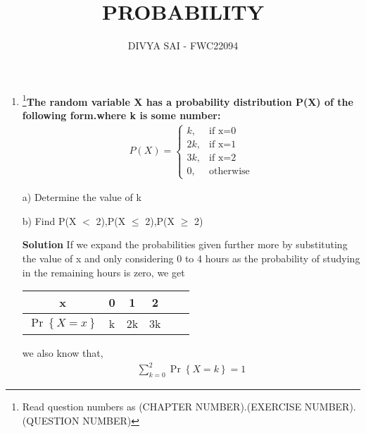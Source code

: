 \documentclass{article}
\providecommand{\cbrak}[1]{\ensuremath{\left\{#1\right\}}}
\begin{document}
\title{PROBABILITY}
\author{\Large DIVYA SAI - FWC22094}
\date{}

\maketitle
\begin{enumerate}
[label=16.\arabic{enumi}.\arabic{enumii}]%
\setcounter{enumi}{3}
\setcounter{enumii}{10}

\item \footnote{Read question numbers as (CHAPTER NUMBER).(EXERCISE NUMBER).(QUESTION NUMBER)}\textbf {The random variable X has a probability distribution P(X) of the following form.where k is some number: }
\begin{align}
  P(X) =
    \begin{cases}
      k,  & \text{if x=0}\\
      2k, & \text{if x=1}\\
      3k, & \text{if x=2}\\
      0 , & \text{otherwise}
    \end{cases}       
\end{align}

a) Determine the value of k 

b) Find P(X $<$ 2),P(X $\leq$ 2),P(X $\geq$ 2)  


\textbf{Solution}
If we expand the probabilities given further more
by substituting the value of x and only considering
0 to 4 hours as the probability of studying in the
remaining hours is zero, we get\\
\begin{center}
\begin{tabular}{|c|c|c|c|c|c|}
    \hline
    x &  0 & 1 & 2 \\
    \hline
    $\Pr\cbrak{X=x}$ & k & 2k & 3k\\
    \hline  
\end{tabular}
\end{center}

we also know that,
\begin{align}
    \sum_{k = 0}^2 \Pr\cbrak{X = k} = 1 \label{eq 2.0.1}
\end{align}


\end{enumerate}
\end{document}

